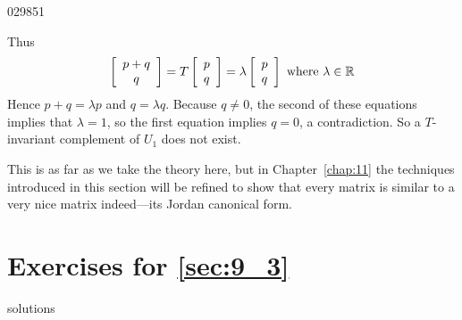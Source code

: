 \begin{example}{}{029851}
\begin{solution}
Thus
\begin{equation*}
\left[ \begin{array}{c} p + q \\ q \end{array} \right] = T\left[ \begin{array}{c} p \\ q \end{array} \right] = \lambda\left[ \begin{array}{c} p \\ q \end{array} \right] \mbox{ where } \lambda \in \mathbb{R}
\end{equation*}
Hence $p + q = \lambda p$ and $q = \lambda q$. Because $q \neq 0$, the second of these equations implies that $\lambda = 1$, so the first equation implies $q = 0$, a contradiction. So a $T$-invariant complement of $U_{1}$ does not exist.
\end{solution}
\end{example}

This is as far as we take the theory here, but in Chapter~\ref{chap:11} the techniques introduced in this section will be refined to show that every matrix is similar to a very nice matrix indeed---its Jordan canonical form.


\section*{Exercises for \ref{sec:9_3}}

\begin{Filesave}{solutions}
\end{Filesave}

